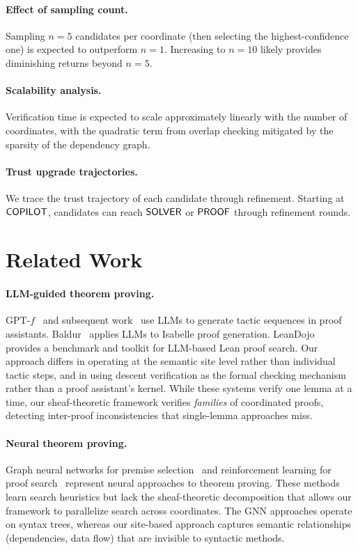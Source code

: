 \documentclass[11pt]{article}
\begin{document}
\paragraph{Effect of sampling count.}
Sampling $n = 5$ candidates per coordinate (then selecting the
highest-confidence one) is expected to outperform $n = 1$.
Increasing to $n = 10$ likely provides diminishing returns
beyond $n = 5$.

\paragraph{Scalability analysis.}
Verification time is expected to scale approximately linearly with the number of
coordinates, with the quadratic term from overlap checking
mitigated by the sparsity of the dependency graph.

\paragraph{Trust upgrade trajectories.}
We trace the trust trajectory of each candidate through refinement.
Starting at $\mathsf{COPILOT}$, candidates
can reach $\mathsf{SOLVER}$ or $\mathsf{PROOF}$ through refinement rounds.


\section{Related Work}\label{sec:related}

\paragraph{LLM-guided theorem proving.}
GPT-$f$~\cite{Polu2020} and subsequent work~\cite{Han2021,Jiang2022}
use LLMs to generate tactic sequences in proof assistants.
Baldur~\cite{First2023} applies LLMs to Isabelle proof generation.
LeanDojo~\cite{Yang2023} provides a benchmark and toolkit for
LLM-based Lean proof search.  Our approach differs in operating at
the semantic site level rather than individual tactic steps, and in
using descent verification as the formal checking mechanism rather
than a proof assistant's kernel.  While these systems verify one
lemma at a time, our sheaf-theoretic framework verifies \emph{families}
of coordinated proofs, detecting inter-proof inconsistencies that
single-lemma approaches miss.

\paragraph{Neural theorem proving.}
Graph neural networks for premise selection~\cite{Paliwal2020} and
reinforcement learning for proof search~\cite{Kaliszyk2018} represent
neural approaches to theorem proving.  These methods learn search
heuristics but lack the sheaf-theoretic decomposition that allows
our framework to parallelize search across coordinates.  The GNN
approaches operate on syntax trees, whereas our site-based approach
captures semantic relationships (dependencies, data flow) that are
invisible to syntactic methods.
\end{document}
